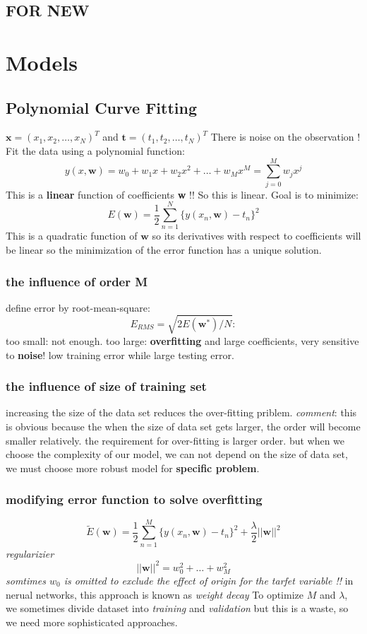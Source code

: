 \documentclass[a4paper]{book}
\newcommand{\mbf}{\mathbf}
\newcommand{\ww}{\mbf w}
\begin{document}
\section{FOR NEW}

\chapter{Models}
\section{Polynomial Curve Fitting}
$\textbf{x} = (x_1,x_2,\dots, x_N)^T $ and $\textbf{t} =(t_1,t_2, \dots, t_N)^T$
There is noise on the observation !\newline
Fit the data using a polynomial function:
$$y(x, \textbf{w}) = w_0+w_1x+w_2x^2+\dots+w_Mx^M=\sum_{j=0}^Mw_jx^j$$
This is a \textbf{linear} function of coefficients \textbf{w}  !! So this is linear.\newline
Goal is to minimize:
$$E(\textbf{w}) = \frac12\sum_{n=1}^N\{y(x_n,\textbf{w})-t_n\}^2$$
This is a quadratic function of $\ww$ so its derivatives with respect to coefficients will be linear so the minimization of the error function has a unique solution.
\subsection{the influence of order M}
define error by root-mean-square:
\begin{equation}\label{2.3}
E_{RMS} = \sqrt{2E(\textbf{w}^*)/N}:
\end{equation}
too small: not enough.\newline
too large: \textbf{overfitting} and large coefficients, very sensitive to \textbf{noise}! low training error while large testing error.
\subsection{the influence of size of training set}
increasing the size of the data set reduces the over-fitting priblem.\newline
\textit{comment}: this is obvious because the when the size of data set gets larger, the order will become smaller relatively. the requirement for over-fitting is larger order. but when we choose the complexity of our model, we can not depend on the size of data set, we must choose more robust model for \textbf{specific problem}.
\subsection{modifying error function to solve overfitting}
\begin{equation}\label{2.4}
\tilde{E}(\textbf{w}) = \frac12\sum_{n=1}^M\{y(x_n,\textbf{w})-t_n\}^2+\frac{\lambda}{2}||\textbf{w}||^2
\end{equation}
\textit{regularizier} $$||\textbf{w}||^2 = w_0^2+\dots+w_M^2$$
\textit
{somtimes $w_0$ is omitted to exclude the effect of origin for the tarfet variable !!}
in nerual networks, this approach is known as \textit{weight decay}
To optimize $M$ and $\lambda$, we sometimes divide dataset into \textit{training} and \textit{validation} but this is a waste, so we need more sophisticated approaches.
\end{document}
